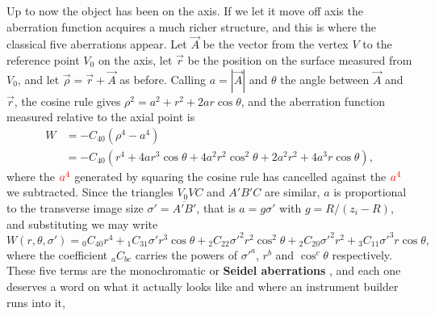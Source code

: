                     Up to now the object has been on the axis. If we let it move off axis the aberration function acquires a much richer structure, and this is where the classical five aberrations appear. Let $\vec{A}$ be the vector from the vertex $V$ to the reference point $V_0$ on the axis, let $\vec{r}$ be the position on the surface measured from $V_0$, and let $\vec{\rho} = \vec{r}+\vec{A}$ as before. Calling $a = |\vec{A}|$ and $\theta$ the angle between $\vec{A}$ and $\vec{r}$, the cosine rule gives $\rho^2 = a^2+r^2+2ar\cos\theta$, and the aberration function measured relative to the axial point is
                    \begin{align}
                        W &= -C_{40}\left( \rho^4 - a^4 \right) \nonumber\\
                        &= -C_{40}\left( r^4 + 4ar^3\cos\theta + 4a^2r^2\cos^2\theta + 2a^2r^2 + 4a^3r\cos\theta \right),\label{eq:SeidelExpansion}
                    \end{align}
                    where the ${\color{red}a^4}$ generated by squaring the cosine rule has cancelled against the ${\color{red}a^4}$ we subtracted. Since the triangles $V_0VC$ and $A'B'C$ are similar, $a$ is proportional to the transverse image size $\sigma' = \overline{A'B'}$, that is $a = g\sigma'$ with $g = R/(z_i-R)$, and substituting we may write
                    \begin{equation}\label{eq:SeidelPolynomial}
                        W\left(r,\theta,\sigma'\right) = {}_{0}C_{40}r^4 + {}_{1}C_{31}\sigma'r^3\cos\theta + {}_{2}C_{22}\sigma'^2r^2\cos^2\theta + {}_{2}C_{20}\sigma'^2r^2 + {}_{3}C_{11}\sigma'^3r\cos\theta,
                    \end{equation}
                    where the coefficient ${}_{a}C_{bc}$ carries the powers of $\sigma'^a$, $r^b$ and $\cos^c\theta$ respectively. These five terms are the monochromatic or \textbf{Seidel aberrations} \citep{welford1986aberrations}, and each one deserves a word on what it actually looks like and where an instrument builder runs into it,

